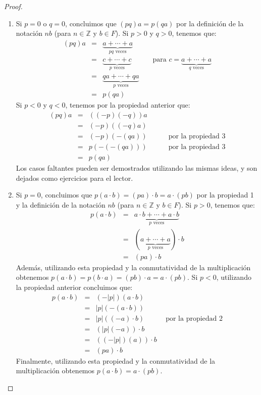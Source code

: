 \begin{proof}
\begin{enumerate}
    \item Si $p = 0$ o $q = 0$, concluimos que $(pq)a = p(qa)$ por
            la definición de la notación $nb$ (para $n \in \mathbb{Z}$ y $b \in
            F$). Si $p > 0$ y $q > 0$, tenemos que:
    \begin{eqnarray*}
    (pq)a &=& \underbrace{a +\cdots + a}_\text{$pq$ veces}\\
     &=& \underbrace{c +\cdots + c}_\text{$p$ veces} \quad\quad\quad \text{para }
     c = \underbrace{a +\cdots + a}_\text{$q$ veces}\\
     & = & \underbrace{qa +\cdots + qa}_\text{$p$ veces}\\
     & = & p(qa)
    \end{eqnarray*}
    Si $p < 0$ y $q < 0$, tenemos por la propiedad anterior que:
    \begin{eqnarray*}
    (pq)a &=& ((-p)(-q))a\\
     &=& (-p)((-q)a)\\
     &=& (-p)(-(qa)) \quad\quad\quad \text{por la propiedad 3}\\
     &=& p(-(-(qa))) \quad\quad\quad \text{por la propiedad 3}\\
     &=& p(qa)
    \end{eqnarray*}
    Los casos faltantes pueden ser demostrados utilizando las mismas ideas, y son dejados como ejercicios para el lector.
    
        \item Si $p = 0$, concluimos que $p(a\cdot b) = (pa)\cdot b = a \cdot (pb)$ por la propiedad 1 y la definición de la notación $nb$ (para $n \in \mathbb{Z}$ y $b \in F$). Si $p > 0$, tenemos que:
        \begin{eqnarray*}
            p(a\cdot b)&=&\underbrace{a\cdot b +\cdots + a\cdot b}_\text{$p$ veces}\\
            &=&(\underbrace{a +\cdots + a}_\text{$p$ veces}) \cdot b\\
            &=&(pa) \cdot b
        \end{eqnarray*}		
    Además, utilizando esta propiedad y la conmutatividad de la multiplicación obtenemos $p(a\cdot b) = p(b \cdot a) = (pb) \cdot a = a \cdot (pb)$. Si $p < 0$, utilizando la propiedad anterior concluimos que:
        \begin{eqnarray*}
            p(a\cdot b)&=& (-|p|)(a \cdot b)\\
            &=& |p|(-(a \cdot b))\\
            &=& |p|((-a) \cdot b) \quad\quad\quad \text{por la propiedad 2}\\
            &=& (|p|(-a)) \cdot b\\
            &=& ((-|p|)(a)) \cdot b\\
            &=& (pa) \cdot b
        \end{eqnarray*}
        Finalmente, utilizando esta propiedad y la conmutatividad de la multiplicación obtenemos $p(a\cdot b) = a \cdot (pb)$. 
        \qedhere
        \end{enumerate}
    \end{proof}
